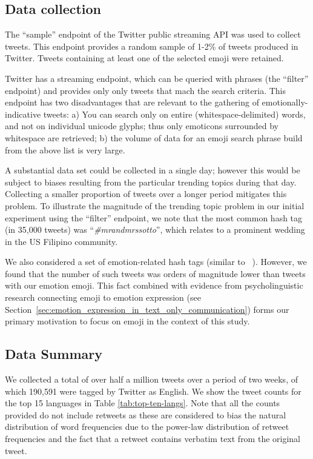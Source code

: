 \documentclass[10pt, a4paper]{article}
\begin{document}
\subsection{Data collection}

The ``sample'' endpoint of the Twitter public streaming API was used to collect tweets. This endpoint provides a random sample of 1-2\% of tweets produced in Twitter.
Tweets containing at least one of the selected emoji were retained. 

Twitter has a streaming endpoint, which can be queried with phrases (the ``filter'' endpoint) and provides only only tweets that mach the search criteria.
This endpoint has two disadvantages that are relevant to the gathering of emotionally-indicative tweets: a) You can search only on entire (whitespace-delimited) words, and not on individual unicode glyphs; thus only emoticons surrounded by whitespace are retrieved; b) the volume of data for an emoji search phrase build from the above list is very large.

A substantial data set could be collected in a single day; however this would be subject to biases resulting from the particular trending topics during that day. 
Collecting a smaller proportion of tweets over a longer period mitigates this problem.
To illustrate the magnitude of the trending topic problem in our initial experiment using the ``filter'' endpoint, we note that the most common hash tag (in 35,000 tweets) was ``\emph{\#mrandmrssotto}'', which relates to a prominent wedding in the US Filipino community.

We also considered a set of emotion-related hash tags (similar to ~\cite{Mohammad2012Emotional}). However, we found that the number of such tweets was orders of magnitude lower than tweets with our emotion emoji. This fact combined with evidence from psycholinguistic research connecting emoji to emotion expression (see Section~\ref{sec:emotion_expression_in_text_only_communication}) forms our primary motivation to focus on emoji in the context of this study.

\subsection{Data Summary}
We collected a total of over half a million tweets over a period of two weeks, of which 190,591 were tagged by Twitter as English. We show the tweet counts for the top 15 languages in Table \ref{tab:top-ten-langs}.
Note that all the counts provided do not include retweets as 
these are considered to bias the natural distribution of word frequencies due to the power-law distribution of retweet frequencies and the fact that a retweet contains verbatim text from the original tweet.
\end{document}
